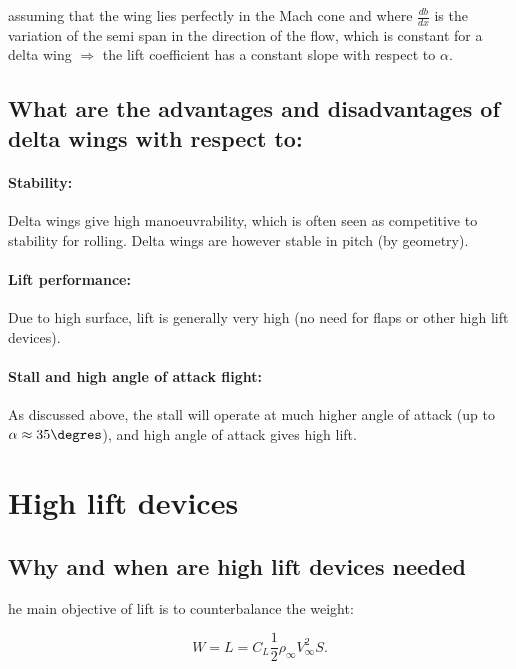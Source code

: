 \documentclass[british,french,11pt, a4paper, openany]{article}
\begin{document}
assuming that the wing lies perfectly in the Mach cone and where $\frac{db}{dx}$ is the variation of the semi span in the direction of the flow, which is constant for a delta wing $\Rightarrow$ the lift coefficient has a constant slope with respect to $\alpha$.

\subsection{What are the advantages and disadvantages of delta wings with respect to:}
\paragraph{Stability:}
Delta wings give high manoeuvrability, which is often seen as competitive to stability for rolling. Delta wings are however stable in pitch (by geometry).

\paragraph{Lift performance:}
Due to high surface, lift is generally very high (no need for flaps or other high lift devices).

\paragraph{Stall and high angle of attack flight:}
As discussed above, the stall will operate at much higher angle of attack (up to $\alpha \approx 35\degres$), and high angle of attack gives high lift.



\section{High lift devices}
\subsection{Why and when are high lift devices needed}
he main objective of lift is to counterbalance the weight: 

\begin{equation}
W = L = C_L \frac{1}{2} \rho _\infty V_\infty ^2 S.
\end{equation}
\end{document}
